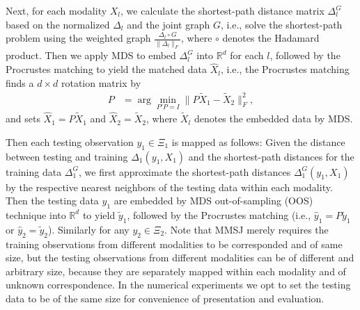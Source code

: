 \documentclass[times,twocolumn,final]{elsarticle}
\begin{document}
Next, for each modality $X_{l}$, we calculate the shortest-path distance matrix $\Delta_{l}^{G}$ based on the normalized $\Delta_{l}$ and the joint graph $G$, i.e., solve the shortest-path problem using the weighted graph $\frac{\Delta_{l} \circ G }{\|\Delta_{l}\|_{F}}$, where $\circ$ denotes the Hadamard product. Then we apply MDS to embed $\Delta_{l}^{G}$ into $\mathbb{R}^{d}$ for each $l$, followed by the Procrustes matching to yield the matched data $\hat{X}_{l}$, i.e., the Procrustes matching finds a $d \times d$ rotation matrix by
\begin{align*}
P&=\arg\min_{P'P=I} \|P \tilde{X}_{1}-\tilde{X}_{2}\|_{F}^{2},
\end{align*}
and sets $\hat{X}_{1}=P \tilde{X}_{1}$ and $\hat{X}_{2}=\tilde{X}_{2}$, where $\tilde{X}_{l}$ denotes the embedded data by MDS.

Then each testing observation $y_{1} \in \Xi_{1}$ is mapped as follows: Given the distance between testing and training $\Delta_{1}(y_{1},X_{1})$ and the shortest-path distances for the training data $\Delta_{1}^{G}$, we first approximate the shortest-path distances $\Delta_{1}^{G}(y_{1},X_{1})$ by the respective nearest neighbors of the testing data within each modality. Then the testing data $y_{1}$ are embedded by MDS out-of-sampling (OOS) technique into $\mathbb{R}^{d}$ to yield $\tilde{y}_{1}$, followed by the Procrustes matching (i.e., $\hat{y}_{1}=P \tilde{y}_{1}$ or $\hat{y}_{2}=\tilde{y}_{2}$). Similarly for any $y_{2} \in \Xi_{2}$. Note that MMSJ merely requires the training observations from different modalities to be corresponded and of same size, but the testing observations from different modalities can be of different and arbitrary size, because they are separately mapped within each modality and of unknown correspondence. In the numerical experiments we opt to set the testing data to be of the same size for convenience of presentation and evaluation.
\end{document}
